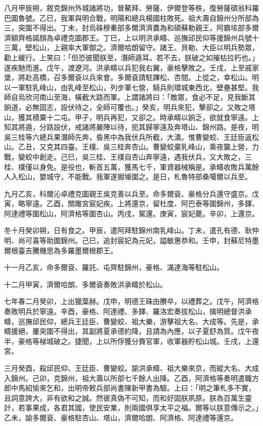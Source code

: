 \begin{pinyinscope}
八月甲辰朔，敘克錦州外城諸將功，晉鰲拜、勞薩、伊爾登等秩，復勞薩碩翁科羅巴圖魯號。乙巳，我軍與明合戰，明陽和總兵楊國柱敗死。祖大壽自錦州分所部為三，突圍不得出。丁未，封烏硃穆秦部多爾濟濟農為和碩蘇勒親王，阿霸垓部多爾濟額齊格諾顏為卓禮克圖郡王。丁巳，上以明洪承疇、巡撫邱民仰等援錦州兵號十三萬，壁松山，上親率大軍御之。濟爾哈朗留守。諸王、貝勒、大臣以明兵勢眾，勸上緩行。上笑曰：「但恐彼聞朕至，潛師遁耳。若不去，朕破之如摧枯拉朽也。」遂疾馳而進。戊午，渡遼河。洪承疇以兵犯我右翼，豪格擊敗之。壬戌，上至戚家堡，將赴高橋，召多爾袞以兵來會。多爾袞請駐蹕松、杏間。上從之，幸松山。明以一軍駐乳峰山，由乳峰至松山，列步軍七營，騎兵則環城東西北，壁壘甚堅。我師自烏欣河南山至海，橫截大路而軍。上謂諸將曰：「敵眾，食必不足，見我斷其餉道，必無固志，設伏待之，全師可覆也。」癸亥，明兵來犯，擊卻之。又敗之塔山，獲其積粟十二屯。甲子，明兵再犯，又卻之。時承疇以餉乏，欲就食寧遠。上知其將遁，分路設伏，戒諸將嚴陣以待，扼其歸寧遠及奔塔山、錦州路。是夜，明吳三桂等六總兵果潛師先奔，昏黑中為我伏兵所截，大潰。惟曹變蛟、王廷臣返松山。乙丑，又克其四臺。王樸、吳三桂奔杏山。曹變蛟棄乳峰山，乘夜襲上營，力戰，變蛟中創走。己巳，吳三桂、王樸自杏山奔寧遠，遇我伏兵，又大敗之，三桂、樸僅以身免。是役也，斬首五萬，獲馬七千，軍資器械稱是。承疇收敗兵萬餘人入松山，嬰城守，不能戰。我軍遂掘壕圍之。是日，札魯特部桑噶爾以兵至。

九月乙亥，科爾沁卓禮克圖親王吳克善以兵至。命多爾袞、豪格分兵還守盛京。戊寅，略寧遠。乙酉，關雎宮宸妃疾。上將還京，留杜度、阿巴泰等圍錦州，多鐸、阿達禮等圍松山，阿濟格等圍杏山。丙戌，駕還。庚寅，宸妃薨。辛卯，上還京。

冬十月癸卯朔，日有食之。甲辰，遣阿拜駐錦州南乳峰山。丁未，遣孔有德、耿仲明、尚可喜等助圍錦州。己巳，追封宸妃為元妃，謚敏惠恭和。壬申，封蘇尼特墨爾根臺吉騰機思為多羅墨爾根郡王。

十一月乙亥，命多爾袞、羅託、屯齊駐錦州，豪格、滿達海等駐松山。

十二月甲寅，濟爾哈朗、多爾袞奏敗洪承疇於松山。

七年春二月癸卯，上出獵葉赫。戊申，明德王硃由賸卒，以禮葬之。戊午，阿濟格奏敗明兵於寧遠。辛酉，豪格、阿達禮、多鐸、羅洛宏奏拔松山，擒明總督洪承疇，巡撫邱民仰，總兵王廷臣、曹變蛟、祖大樂，游擊祖大名、大成等。先是，承疇援絕，屢突圍不得出，其副將夏承德約降，且請為內應，以子夏舒為質。戊午夜半，豪格等梯城破之。捷聞，上以所俘獲分賚官軍，收軍器貯松山城。壬戌，上還宮。

三月癸酉，殺邱民仰、王廷臣、曹變蛟。諭洪承疇、祖大樂來京，而縱大名、大成入錦州。己卯，克錦州，祖大壽以所部七千餘人出降。乙酉，阿濟格等奏明遣職方郎中馬紹愉來乞和，出明帝敕兵部尚書陳新甲書為驗。上曰：「明之筆札多不實，且詞意誇大，非有欲和之誠。然彼真偽不可知，而和好固朕夙原。朕為百萬生靈計，若事果成，各君其國，使民安業，則兩國俱享太平之福。爾等以朕意傳示之。」乙未，諭多爾袞、豪格駐杏山、塔山，濟爾哈朗、阿濟格、阿達禮等還京。


\end{pinyinscope}
